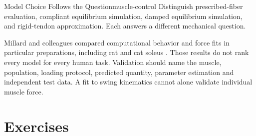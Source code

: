 \begin{principle}{Model Choice Follows the Question}{muscle-control}
 Distinguish prescribed-fiber evaluation, compliant equilibrium simulation,
 damped equilibrium simulation, and rigid-tendon approximation.
 Each answers a different mechanical question.

 Millard and colleagues compared computational behavior and force fits in
 particular preparations, including rat and cat soleus \cite{millard2013flexing}.
 Those results do not rank every model for every human task.
 Validation should name the muscle, population, loading protocol, predicted
 quantity, parameter estimation and independent test data.
 A fit to swing kinematics cannot alone validate individual muscle force.
\end{principle}

\section*{Exercises}

